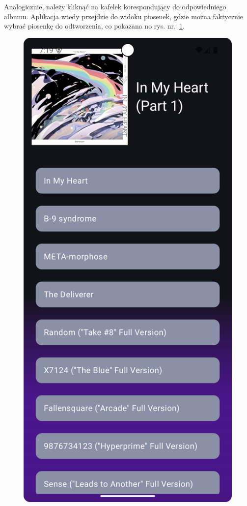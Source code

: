 Analogicznie, należy kliknąć na kafelek korespondujący do odpowiedniego albumu. Aplikacja wtedy przejdzie do widoku piosenek, gdzie można faktycznie wybrać piosenkę do odtworzenia, co pokazana no rys. nr.~\ref{fig:tutorial_song_view}. 

\begin{figure}[H]
	\centering
	\includegraphics[width=1\textwidth]{images/tutorial_song_view.png}
	\caption{}
	\label{fig:tutorial_song_view}
\end{figure}

